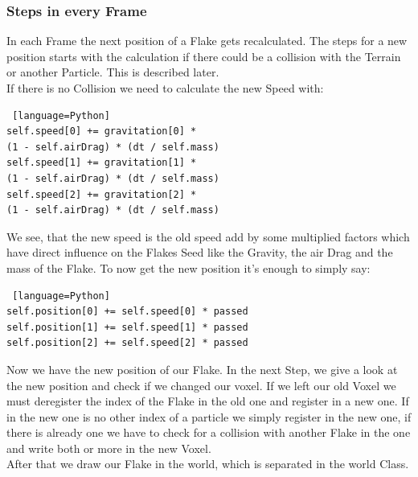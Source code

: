 \documentclass{sig-alternate-05-2015}
\begin{document}
\subsubsection{Steps in every Frame}
In each Frame the next position of a Flake gets recalculated. The steps for a new position starts with the calculation if there could be a collision with the Terrain or another Particle. This is described later. \\
If there is no Collision we need to calculate the new Speed with:\\
\begin{lstlisting} [language=Python]
self.speed[0] += gravitation[0] * 
(1 - self.airDrag) * (dt / self.mass)
self.speed[1] += gravitation[1] * 
(1 - self.airDrag) * (dt / self.mass)
self.speed[2] += gravitation[2] * 
(1 - self.airDrag) * (dt / self.mass)
\end{lstlisting}
We see, that the new speed is the old speed add by some multiplied factors which have direct influence on the Flakes Seed like the Gravity, the air Drag and the mass of the Flake. To now get the new position it's enough to simply say: \\
\begin{lstlisting} [language=Python]
self.position[0] += self.speed[0] * passed
self.position[1] += self.speed[1] * passed
self.position[2] += self.speed[2] * passed
\end{lstlisting}
Now we have the new position of our Flake. In the next Step, we give a look at the new position and check if we changed our voxel. If we left our old Voxel we must deregister the index of the Flake in the old one and register in a new one. If in the new one is no other index of a particle we simply register in the new one, if there is already one we have to check for a collision with another Flake in the one and write both or more in the new Voxel. \\
After that we draw our Flake in the world, which is separated in the world Class. \\
\end{document}
